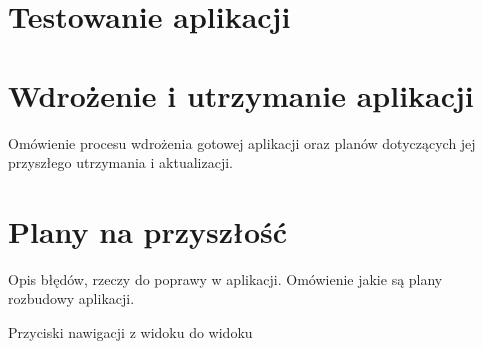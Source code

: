\section{Testowanie aplikacji}




\section{Wdrożenie i utrzymanie aplikacji}

Omówienie procesu wdrożenia gotowej aplikacji oraz planów dotyczących jej przyszłego utrzymania i aktualizacji.



\section{Plany na przyszłość} \label{sec:plans}

Opis błędów, rzeczy do poprawy w aplikacji. Omówienie jakie są plany rozbudowy aplikacji.

Przyciski nawigacji z widoku do widoku